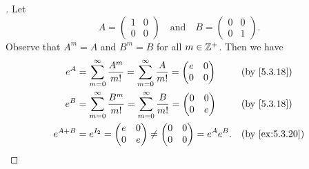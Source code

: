 \begin{proof}[]
  Let
  \[
    A = \begin{pmatrix}
      1 & 0 \\
      0 & 0
    \end{pmatrix} \quad \text{and} \quad B = \begin{pmatrix}
      0 & 0 \\
      0 & 1
    \end{pmatrix}.
  \]
  Observe that \(A^m = A\) and \(B^m = B\) for all \(m \in \mathbb{Z}^+\).
  Then we have
  \begin{align*}
    e^A       & = \sum_{m = 0}^\infty \dfrac{A^m}{m!} = \sum_{m = 0}^\infty \dfrac{A}{m!} = \begin{pmatrix}
                                                                                              e & 0 \\
                                                                                              0 & 0
                                                                                            \end{pmatrix} &  & \by{5.3.18}                           \\
    e^B       & = \sum_{m = 0}^\infty \dfrac{B^m}{m!} = \sum_{m = 0}^\infty \dfrac{B}{m!} = \begin{pmatrix}
                                                                                              0 & 0 \\
                                                                                              0 & e
                                                                                            \end{pmatrix} &  & \by{5.3.18}                           \\
    e^{A + B} & = e^{I_2} = \begin{pmatrix}
                              e & 0 \\
                              0 & e
                            \end{pmatrix} \neq \begin{pmatrix}
                                                 0 & 0 \\
                                                 0 & 0
                                               \end{pmatrix} = e^A e^B.                                                          &  & \by{ex:5.3.20}
  \end{align*}
\end{proof}

